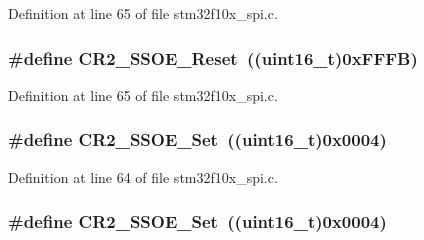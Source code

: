 Definition at line 65 of file stm32f10x\+\_\+spi.\+c.

\subsubsection[{\texorpdfstring{C\+R2\+\_\+\+S\+S\+O\+E\+\_\+\+Reset}{CR2_SSOE_Reset}}]{\setlength{\rightskip}{0pt plus 5cm}\#define C\+R2\+\_\+\+S\+S\+O\+E\+\_\+\+Reset~(({\bf uint16\+\_\+t})0x\+F\+F\+F\+B)}\hypertarget{group___s_p_i___private___defines_ga475caaaef8732d35e4c6fd3f21dc4e3c}{}\label{group___s_p_i___private___defines_ga475caaaef8732d35e4c6fd3f21dc4e3c}


Definition at line 65 of file stm32f10x\+\_\+spi.\+c.

\subsubsection[{\texorpdfstring{C\+R2\+\_\+\+S\+S\+O\+E\+\_\+\+Set}{CR2_SSOE_Set}}]{\setlength{\rightskip}{0pt plus 5cm}\#define C\+R2\+\_\+\+S\+S\+O\+E\+\_\+\+Set~(({\bf uint16\+\_\+t})0x0004)}\hypertarget{group___s_p_i___private___defines_gaae3c2720c0b63d7cc26046969a45a6c1}{}\label{group___s_p_i___private___defines_gaae3c2720c0b63d7cc26046969a45a6c1}


Definition at line 64 of file stm32f10x\+\_\+spi.\+c.

\subsubsection[{\texorpdfstring{C\+R2\+\_\+\+S\+S\+O\+E\+\_\+\+Set}{CR2_SSOE_Set}}]{\setlength{\rightskip}{0pt plus 5cm}\#define C\+R2\+\_\+\+S\+S\+O\+E\+\_\+\+Set~(({\bf uint16\+\_\+t})0x0004)}\hypertarget{group___s_p_i___private___defines_gaae3c2720c0b63d7cc26046969a45a6c1}{}\label{group___s_p_i___private___defines_gaae3c2720c0b63d7cc26046969a45a6c1}


